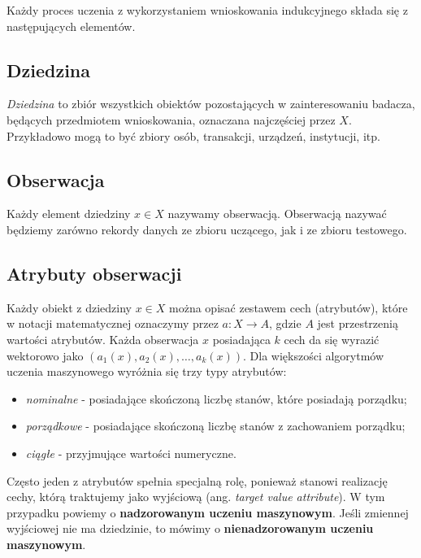 \documentclass[]{book}
\providecommand{\tightlist}{%
  \setlength{\itemsep}{0pt}\setlength{\parskip}{0pt}}
\theoremstyle{plain}
\theoremstyle{definition}
\theoremstyle{definition}
\theoremstyle{definition}
\theoremstyle{definition}
\theoremstyle{remark}
\begin{document}
Każdy proces uczenia z wykorzystaniem wnioskowania indukcyjnego składa się z następujących elementów.

\hypertarget{dziedzina}{%
\subsection{Dziedzina}\label{dziedzina}}

\emph{Dziedzina} to zbiór wszystkich obiektów pozostających w zainteresowaniu badacza, będących przedmiotem wnioskowania, oznaczana najczęściej przez \(X\). Przykładowo mogą to być zbiory osób, transakcji, urządzeń, instytucji, itp.

\hypertarget{obserwacja}{%
\subsection{Obserwacja}\label{obserwacja}}

Każdy element dziedziny \(x\in X\) nazywamy obserwacją. Obserwacją nazywać będziemy zarówno rekordy danych ze zbioru uczącego, jak i ze zbioru testowego.

\hypertarget{atrybuty-obserwacji}{%
\subsection{Atrybuty obserwacji}\label{atrybuty-obserwacji}}

Każdy obiekt z dziedziny \(x\in X\) można opisać zestawem cech (atrybutów), które w notacji matematycznej oznaczymy przez \(a:X\to A\), gdzie \(A\) jest przestrzenią wartości atrybutów. Każda obserwacja \(x\) posiadająca \(k\) cech da się wyrazić wektorowo jako \((a_1(x), a_2(x), \ldots, a_k(x))\). Dla większości algorytmów uczenia maszynowego wyróżnia się trzy typy atrybutów:

\begin{itemize}
\tightlist
\item
  \emph{nominalne} - posiadające skończoną liczbę stanów, które posiadają porządku;
\item
  \emph{porządkowe} - posiadające skończoną liczbę stanów z zachowaniem porządku;
\item
  \emph{ciągłe} - przyjmujące wartości numeryczne.
\end{itemize}

Często jeden z atrybutów spełnia specjalną rolę, ponieważ stanowi realizację cechy, którą traktujemy jako wyjściową (ang. \emph{target value attribute}). W tym przypadku powiemy o \textbf{nadzorowanym uczeniu maszynowym}. Jeśli zmiennej wyjściowej nie ma dziedzinie, to mówimy o \textbf{nienadzorowanym uczeniu maszynowym}.
\end{document}
